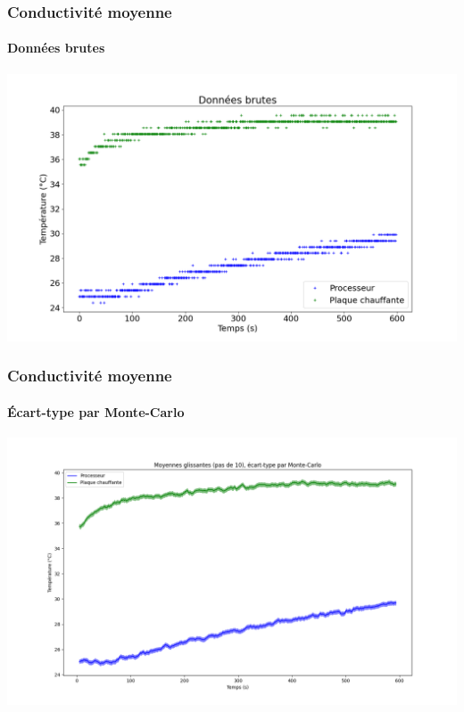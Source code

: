 \documentclass[a4paper,11pt]{beamer}
\begin{document}
\begin{frame}
    \frametitle{Conductivité moyenne}
    \framesubtitle{Données brutes}

    \includegraphics[width=\textwidth]{donnees_brutes.png}
\end{frame}

\begin{frame}
    \frametitle{Conductivité moyenne}
    \framesubtitle{Écart-type par Monte-Carlo}

    \includegraphics[width=\textwidth]{moyennes_glissantes_monte_carlo.png}
\end{frame}
\end{document}
